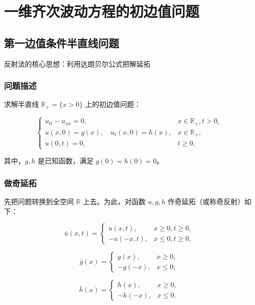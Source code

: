 \documentclass[12pt,a4paper]{article}
\numberwithin{subsection}{section}   %
\numberwithin{subsubsection}{subsection}
\theoremstyle{plain}
\theoremstyle{definition}
\theoremstyle{remark}
\theoremstyle{remark}
\begin{document}
	\section{一维齐次波动方程的初边值问题}
	\subsection{第一边值条件半直线问题}
	反射法的核心思想：利用达朗贝尔公式把解延拓
	
	\subsubsection{问题描述}
	求解半直线 \(\mathbb{R}_+ = \{x > 0\}\) 上的初边值问题：
	
	\begin{equation}
		\begin{cases}
			u_{tt} - u_{xx} = 0, & x \in \mathbb{R}_+, t > 0, \\
			u(x, 0) = g(x), \quad u_t(x, 0) = h(x), & x \in \mathbb{R}_+, \\
			u(0, t) = 0, & t \geq 0,
		\end{cases}
	\end{equation}
	
	其中，\(g, h\) 是已知函数，满足 \(g(0) = h(0) = 0\)。
	
	\subsubsection{做奇延拓}
先把问题转换到全空间 \(\mathbb{R}\) 上去。为此，对函数 \(u, g, h\) 作奇延拓（或称奇反射）如下：
	
	\begin{equation}
		\bar{u}(x, t) = \begin{cases}
			u(x, t), & x \geq 0, t \geq 0, \\
			-u(-x, t), & x \leq 0, t \geq 0,
		\end{cases}
	\end{equation}
	
	\begin{equation}
		\bar{g}(x) = \begin{cases}
			g(x), & x \geq 0, \\
			-g(-x), & x \leq 0,
		\end{cases}
	\end{equation}
	
	\begin{equation}
		\bar{h}(x) = \begin{cases}
			h(x), & x \geq 0, \\
			-h(-x), & x \leq 0.
		\end{cases}
	\end{equation}
	
\end{document}
